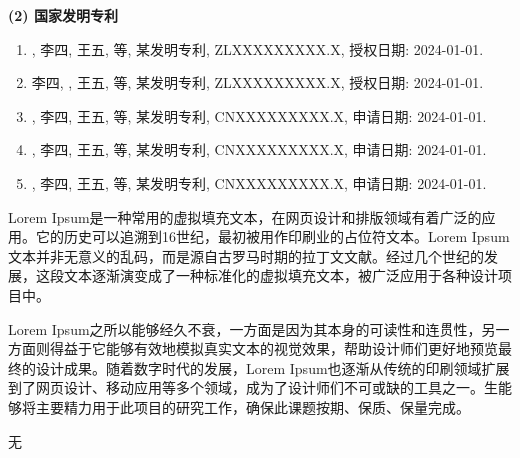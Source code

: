 \documentclass[UTF8,12pt,AutoFakeBold=2]{ctexart}
\begin{document}
\noindent\textbf{(2) 国家发明专利}
\begin{sloppypar}
	\small
	\begin{enumerate}[align=right, labelindent=0pt, itemindent=0pt, leftmargin=\parindent]
		\item {}, 李四, 王五, 等, 某发明专利, ZLXXXXXXXXX.X, 授权日期: 2024-01-01.
  		\item 李四, , 王五, 等, 某发明专利, ZLXXXXXXXXX.X, 授权日期: 2024-01-01.
		\item {}, 李四, 王五, 等, 某发明专利, CNXXXXXXXXX.X, 申请日期: 2024-01-01.
  		\item {}, 李四, 王五, 等, 某发明专利, CNXXXXXXXXX.X, 申请日期: 2024-01-01.
		\item {}, 李四, 王五, 等, 某发明专利, CNXXXXXXXXX.X, 申请日期: 2024-01-01.
	\end{enumerate}
\end{sloppypar}


Lorem Ipsum是一种常用的虚拟填充文本，在网页设计和排版领域有着广泛的应用。它的历史可以追溯到16世纪，最初被用作印刷业的占位符文本。Lorem Ipsum文本并非无意义的乱码，而是源自古罗马时期的拉丁文文献。经过几个世纪的发展，这段文本逐渐演变成了一种标准化的虚拟填充文本，被广泛应用于各种设计项目中。

Lorem Ipsum之所以能够经久不衰，一方面是因为其本身的可读性和连贯性，另一方面则得益于它能够有效地模拟真实文本的视觉效果，帮助设计师们更好地预览最终的设计成果。随着数字时代的发展，Lorem Ipsum也逐渐从传统的印刷领域扩展到了网页设计、移动应用等多个领域，成为了设计师们不可或缺的工具之一。生能够将主要精力用于此项目的研究工作，确保此课题按期、保质、保量完成。


无

\end{document}
